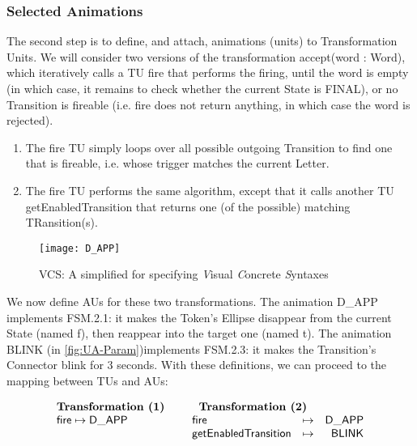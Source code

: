 \subsubsection{Selected Animations}
\label{sec:Proposal-FSM-ANIM}

The second step is to define, and attach, animations (units) to Transformation 
Units. We will consider two versions of the transformation \textsf{accept(word :
Word)}, which iteratively calls a TU \textsf{fire} that performs the firing, 
until the \textsf{word} is empty (in which case, it remains to check whether 
the current \textsf{State} is \textsf{FINAL}), or no \textsf{Transition} is 
fireable (i.e. \textsf{fire} does not return anything, in which case the 
\textsf{word} is rejected).
\begin{enumerate}
	\item The \textsf{fire} TU simply loops over all possible outgoing \textsf{Transition}
   to find one that is fireable, i.e. whose \textsf{trigger} matches the current \textsf{Letter}.
   
   \item The \textsf{fire} TU performs the same algorithm, except that it calls
   another TU \textsf{getEnabledTransition} that returns one (of the possible) matching
   \textsf{TRansition}(s).
\end{enumerate}

\begin{figure}[t]%
   \centering
   \texttt{[image: D\_APP]}%
   \caption{\textsf{VCS}: A simplified \DSL for specifying \emph{V}isual \emph{C}oncrete \emph{S}yntaxes}%
   \label{fig:VCS}%
\end{figure}

We now define AUs for these two transformations. The animation \textsf{D\_APP}
implements \textsf{FSM.2.1}: it makes the \textsf{Token}'s \textsf{Ellipse} 
disappear from the current \textsf{State} (named \textsf{f}), then reappear 
into the target one (named \textsf{t}). 
The animation \textsf{BLINK} (in \autoref{fig:UA-Param})implements \textsf{FSM.2.3}:
it makes the \textsf{Transition}'s \textsf{Connector} blink for 3 seconds.
With these definitions, we can proceed to the mapping between TUs and AUs:

$$\begin{array}[t]{l}
   \textbf{Transformation (1)}\\
   \mathsf{fire} \mapsto \mathsf{D\_APP}
\end{array}
\hspace{0.5cm}
\begin{array}[t]{lcr}
   \multicolumn{2}{c}{\textbf{Transformation (2)}}\\
	\mathsf{fire} &\mapsto& \mathsf{D\_APP}\\
	\mathsf{getEnabledTransition} &\mapsto& \mathsf{BLINK}	
\end{array}$$

